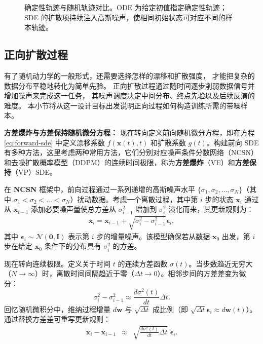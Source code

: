 \documentclass[UTF8,a4paper,zihao=-4,oneside,openany]{ctexbook}
\makeatletter
\newcommand{\AMLFigure}[2][0.96\linewidth]{%
  \begingroup
  \let\AtBeginDocument\@gobble
  \endgroup
}
\makeatother
\begin{document}
\begin{figure}[!t]
\centering
\AMLFigure{figure-forward-sde-example}
\caption{确定性轨迹与随机轨迹对比。ODE 为给定初值指定确定性轨迹；SDE 的扩散项持续注入高斯噪声，使相同初始状态可对应不同的样本轨迹。}
\label{fig:forward-sde-example}
\end{figure}

\subsection{正向扩散过程}

有了随机动力学的一般形式，还需要选择怎样的漂移和扩散强度，
才能把复杂的数据分布平稳地转化为简单先验。
正向扩散过程通过随时间逐步削弱数据信号并增加噪声来完成这一任务，
其噪声调度决定中间分布、终点先验以及后续反演的难度。
本小节将从这一设计目标出发说明正向过程如何构造训练所需的带噪样本。


\textbf{方差爆炸与方差保持随机微分方程：} 现在转向定义前向随机微分方程，即在方程 \eqref{eq:forward-sde} 中定义漂移系数 $f(\mathbf{x}(t),t)$ 和扩散系数 $g(t)$。构建前向 SDE 有多种方法，这里考虑两种常用方法，它们分别对应噪声条件分数网络（NCSN）和去噪扩散概率模型（DDPM）的连续时间极限，称为\textbf{方差爆炸}（VE）和\textbf{方差保持}（VP）SDE。

在 \textbf{NCSN} 框架中，前向过程通过一系列递增的高斯噪声水平 $\{\sigma_1, \sigma_2, \dots, \sigma_N\}$（其中 $\sigma_1 < \sigma_2 < \dots < \sigma_N$）扰动数据。考虑一个离散过程，其中第 $i$ 步的状态 $\mathbf{x}_i$ 通过从 $\mathbf{x}_{i-1}$ 添加必要噪声量使总方差从 $\sigma_{i-1}^2$ 增加到 $\sigma_i^2$ 演化而来，其更新规则为：
\begin{eqnarray}
\mathbf{x}_i = \mathbf{x}_{i-1} + \sqrt{\sigma_i^2 - \sigma_{i-1}^2} \boldsymbol{\epsilon}_i,
\end{eqnarray}
其中 $\boldsymbol{\epsilon}_i \sim \mathcal{N}(\mathbf{0}, \mathbf{I})$ 表示第 $i$ 步的增量噪声。该模型确保若从数据 $\mathbf{x}_0$ 出发，第 $i$ 步在给定 $\mathbf{x}_0$ 条件下的分布具有 $\sigma_i^2$ 的方差。

现在转向连续极限。定义关于时间 $t$ 的连续方差函数 $\sigma(t)$。当步数趋近无穷大（$N \to \infty$）时，离散时间间隔趋近于零（$\Delta t \to 0$）。相邻步间的方差差变为微分：
\begin{equation}
\sigma_i^2 - \sigma_{i-1}^2 \approx \frac{d\sigma^2(t)}{dt} \Delta t.
\end{equation}
回忆随机微积分中，维纳过程增量 $d\mathbf{w}$ 与 $\sqrt{\Delta t}$ 成比例（即 $\sqrt{\Delta t} \boldsymbol{\epsilon}_i \approx d\mathbf{w}(t)$）。通过替换方差差可重写更新规则：
\begin{eqnarray}
\mathbf{x}_i - \mathbf{x}_{i-1} & \approx & \sqrt{\frac{d\sigma^2(t)}{dt} \Delta t} \; \boldsymbol{\epsilon}_i.
\end{eqnarray}
\end{document}
